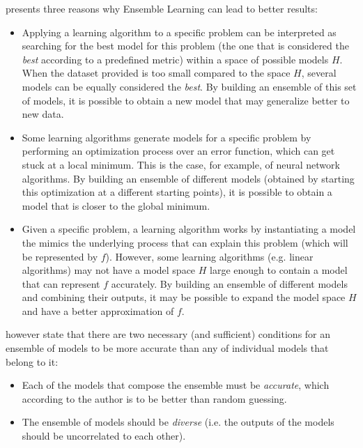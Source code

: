 \textcite{Dietterich1990} presents three reasons why Ensemble Learning can lead to better results:

\begin{itemize}
	\item Applying a learning algorithm to a specific problem can be interpreted as searching for the best model for this problem (the one that is considered the \textit{best} according to a predefined metric) within a space of possible models $H$. When the dataset provided is too small compared to the space $H$, several models can be equally considered the \textit{best}. By building an ensemble of this set of models, it is possible to obtain a new model that may generalize better to new data.
	
	\item Some learning algorithms generate models for a specific problem by performing an optimization process over an error function, which can get stuck at a local minimum. This is the case, for example, of neural network algorithms. By building an ensemble of different models (obtained by starting this optimization at a different starting points), it is possible to obtain a model that is closer to the global minimum.
	
	\item Given a specific problem, a learning algorithm works by instantiating a model the mimics the underlying process that can explain this problem (which will be represented by $f$). However, some learning algorithms (e.g. linear algorithms) may not have a model space $H$ large enough to contain a model that can represent $f$ accurately. By building an ensemble of different models and combining their outputs, it may be possible to expand the model space $H$ and have a better approximation of $f$.
\end{itemize}

\textcite{hansen1990neural} however state that there are two necessary (and sufficient) conditions for an ensemble of models to be more accurate than any of individual models that belong to it:

\begin{itemize}
	\item Each of the models that compose the ensemble must be \textit{accurate}, which according to the author is to be better than random guessing.
	
	\item The ensemble of models should be \textit{diverse} (i.e. the outputs of the models should be uncorrelated to each other).
\end{itemize}

